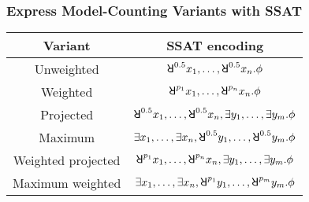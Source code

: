 \begin{frame}
      \frametitle{Express Model-Counting Variants with SSAT}
      \begin{table}[t]
            \centering
            \begin{tabular}{c|c}
                  Variant            & SSAT encoding                                                               \\
                  \hline
                  Unweighted         & $\random{0.5}x_1,\ldots,\random{0.5}x_n.\pf$                                \\
                  Weighted           & $\random{p_1}x_1,\ldots,\random{p_n}x_n.\pf$                                \\
                  Projected          & $\random{0.5}x_1,\ldots,\random{0.5}x_n,\exists y_1,\ldots,\exists y_m.\pf$ \\
                  Maximum            & $\exists x_1,\ldots,\exists x_n,\random{0.5}y_1,\ldots,\random{0.5}y_m.\pf$ \\
                  Weighted projected & $\random{p_1}x_1,\ldots,\random{p_n}x_n,\exists y_1,\ldots,\exists y_m.\pf$ \\
                  Maximum weighted   & $\exists x_1,\ldots,\exists x_n,\random{p_1}y_1,\ldots,\random{p_m}y_m.\pf$ \\
            \end{tabular}
      \end{table}
\end{frame}